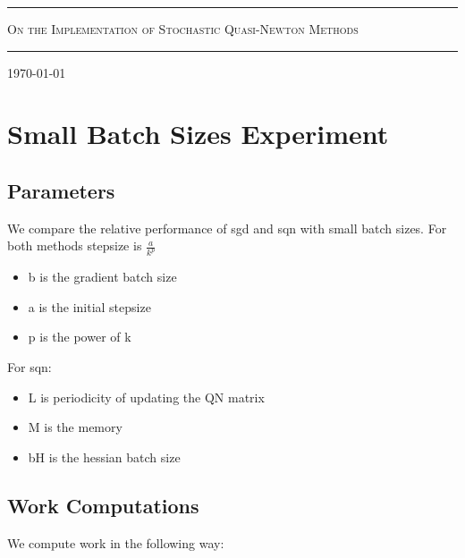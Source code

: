 \documentclass[12pt]{article}
\begin{document}
\newcommand{\tr}{\mbox{tr}} 
\newtheorem{theorem}{Theorem}[section] 
\newtheorem{lemma}[theorem]{Lemma} 
\newtheorem{proposition}[theorem]{Proposition} 
\newtheorem{corollary}[theorem]{Corollary}

\pgfplotsset{compat=newest} 
\pgfplotsset{plot coordinates/math parser=false} 

\begin{titlepage}
	
	\hrule 
	\begin{center}
		\large \textsc{On the Implementation of Stochastic Quasi-Newton Methods}\\
	\end{center}
	\hrule \normalsize
	
	\bigskip 
	\bigskip
	
	\centering\today
	
	\bigskip 
	\bigskip
	
	\tableofcontents 
\end{titlepage}

\newpage

\section{Small Batch Sizes Experiment}
\label{sec:aoverk}

\subsection{Parameters}
We compare the relative performance of sgd and sqn with small batch sizes. For both methods stepsize is $\frac{a}{k^p}$ 
\begin{itemize}
	\item b is the gradient batch size 
	\item a is the initial stepsize 
	\item p is the power of k 
\end{itemize}

For sqn: 
\begin{itemize}
	\item L is periodicity of updating the QN matrix 
	\item M is the memory 
	\item bH is the hessian batch size 
\end{itemize}

\subsection{Work Computations}
We compute work in the following way:
\end{document}
